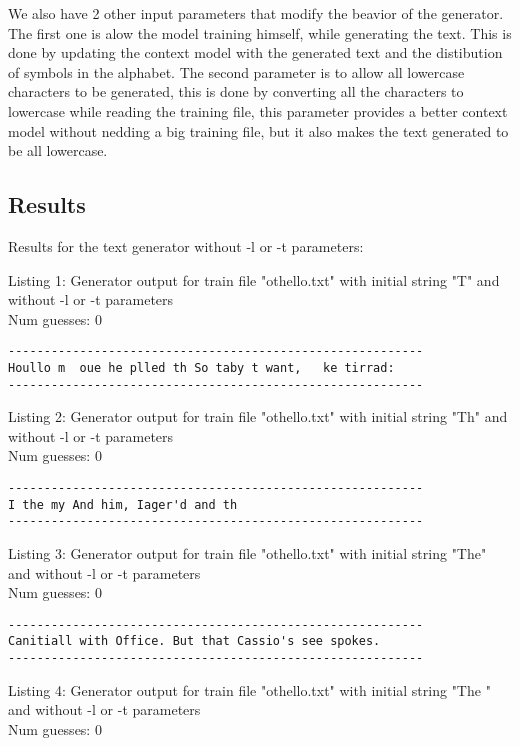 \documentclass{article}
\begin{document}
We also have 2 other input parameters that modify the beavior of the generator. The first one is alow the model training himself, while generating the text. This is done by updating the context model with the generated text and the distibution of symbols in the alphabet.
The second parameter is to allow all lowercase characters to be generated, this is done by converting all the characters to lowercase while reading the training file, this parameter provides a better context model without nedding a big training file, but it also makes the text generated to be all lowercase.


\subsection{Results}


Results for the text generator without -l or -t parameters:

\hfill

Listing 1: Generator output for train file "othello.txt" with initial string "T" and without -l or -t parameters
\\Num guesses: 0

\begin{lstlisting}
----------------------------------------------------------
Houllo m  oue he plled th So taby t want,   ke tirrad:
----------------------------------------------------------
\end{lstlisting}

Listing 2: Generator output for train file "othello.txt" with initial string "Th" and without -l or -t parameters
\\Num guesses: 0

\begin{lstlisting}
----------------------------------------------------------
I the my And him, Iager'd and th
----------------------------------------------------------
\end{lstlisting}

Listing 3: Generator output for train file "othello.txt" with initial string "The" and without -l or -t parameters
\\Num guesses: 0

\begin{lstlisting}
----------------------------------------------------------
Canitiall with Office. But that Cassio's see spokes.
----------------------------------------------------------
\end{lstlisting}

Listing 4: Generator output for train file "othello.txt" with initial string "The " and without -l or -t parameters
\\Num guesses: 0
\end{document}
